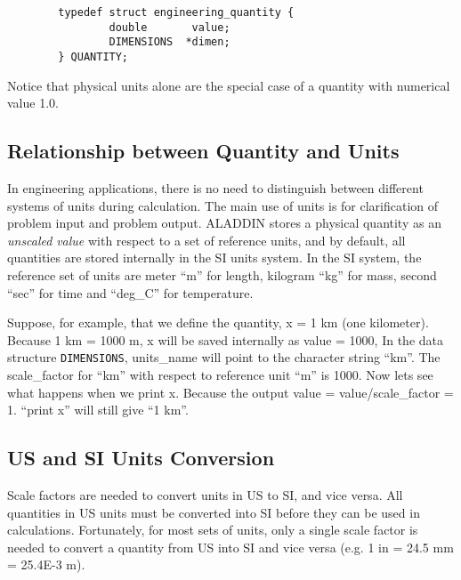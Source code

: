 \begin{footnotesize}
\begin{verbatim}
        typedef struct engineering_quantity {
                double       value;
                DIMENSIONS  *dimen;
        } QUANTITY;
\end{verbatim}
\end{footnotesize}

\vspace{0.15 in}\noindent
Notice that physical units alone are the special
case of a quantity with numerical value 1.0.
 
\subsection{Relationship between Quantity and Units}

\vspace{0.15 in}
\noindent\hspace{0.5 in}
In engineering applications, there is no need to distinguish
between different systems of units during calculation.
The main use of units is for clarification
of problem input and problem output.
ALADDIN stores a physical quantity as an {\em unscaled} {\em value}
with respect to a set of reference units,
and by default, all quantities are stored internally in the SI units system.
In the SI system, the reference set of units are
meter ``m'' for length, kilogram ``kg'' for mass,
second ``sec'' for time and ``deg\_C'' for temperature.

\vspace{0.15 in}
\noindent\hspace{0.5 in}
Suppose, for example, that we define the quantity, x = 1 km (one kilometer).
Because 1 km = 1000 m, x will be saved internally as value = 1000,
In the data structure {\tt DIMENSIONS},
units\_name will point to the character string ``km''.
The scale\_factor for ``km'' with respect to reference unit ``m'' is 1000.
Now lets see what happens when we print x.
Because the output value = value/scale\_factor = 1.
``print x'' will still give ``1 km''.

\subsection{US and SI Units Conversion}

\vspace{0.15 in}
\noindent\hspace{0.5 in}
Scale factors are needed to convert units in US to SI, and vice versa.
All quantities in US units must be converted into SI
before they can be used in calculations. Fortunately,
for most sets of units, only a single scale factor is
needed to convert a quantity from US into SI and
vice versa (e.g.  1 in = 24.5 mm = 25.4E-3 m).

